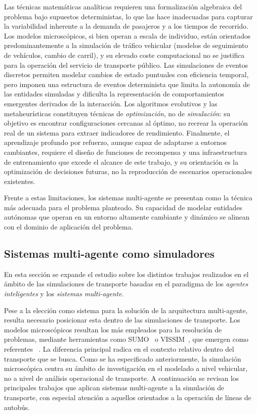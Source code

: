 Las técnicas matemáticas analíticas requieren una formalización algebraica del 
problema bajo supuestos deterministas, lo que las hace inadecuadas para capturar 
la variabilidad inherente a la demanda de pasajeros y a los tiempos 
de recorrido. Los modelos microscópicos, si bien operan a escala de individuo, 
están orientados predominantemente a la simulación de tráfico vehicular 
(modelos de seguimiento de vehículos, cambio de carril), y su elevado coste 
computacional no se justifica para la operación del servicio de transporte público. Las simulaciones 
de eventos discretos permiten modelar cambios de estado puntuales con eficiencia 
temporal, pero imponen una estructura de eventos determinista que limita la 
autonomía de las entidades simuladas y dificulta la representación de 
comportamientos emergentes derivados de la interacción. 
Los algoritmos evolutivos y las metaheurísticas constituyen técnicas de 
\textit{optimización}, no de \textit{simulación}: su objetivo es encontrar 
configuraciones cercanas al óptimo, no recrear la operación real de un sistema 
para extraer indicadores de rendimiento. Finalmente, el aprendizaje profundo por 
refuerzo, aunque capaz de adaptarse a entornos cambiantes, requiere el diseño de 
funciones de recompensa y una infraestructura de entrenamiento que excede el 
alcance de este trabajo, y su orientación es la optimización de decisiones 
futuras, no la reproducción de escenarios operacionales existentes.

Frente a estas limitaciones, los sistemas multi-agente se presentan como la 
técnica más adecuada para el problema planteado. Su capacidad de modelar 
entidades autónomas que operan en un entorno altamente cambiante y dinámico se alinean con el dominio de 
aplicación del problema.

\subsection{Sistemas multi-agente como simuladores}
En esta sección se expande el estudio sobre los distintos trabajos realizados en el ámbito de las simulaciones
de transporte basadas en el paradigma de los \textit{agentes inteligentes} y los \textit{sistemas multi-agente}.

Pese a la elección como sistema para la solución de la arquitectura multi-agente, resulta necesario posicionar esta 
dentro de las simulaciones de transporte. Los modelos microscópicos resultan los más empleados para la resolución de problemas,
mediante herramientas como SUMO~\cite{lopez2018sumo} o VISSIM~\cite{fellendorf2010vissim}, que emergen como referentes
~\cite{saidallah2016comparative}. La diferencia principal radica en el contexto relativo dentro del transporte que se busca. 
Como se ha especificado anteriormente, la simulación microscópica centra su ámbito de investigación en el modelado 
a nivel vehicular, no a nivel de análisis operacional de transporte. A continuación se revisan los principales trabajos que
aplican sistemas multi-agente a la simulación de transporte, con especial atención a aquellos orientados a la operación de 
líneas de autobús.

